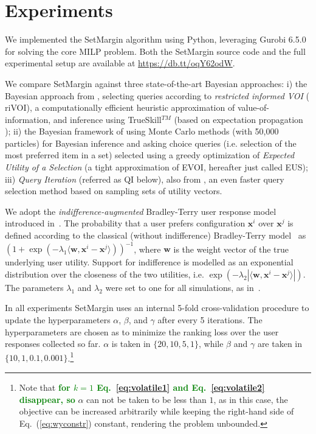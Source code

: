\documentclass{article}
\renewcommand\[{\begin{equation}}
\renewcommand\]{\end{equation}}
\newcommand{\vecvar}[1]{\ensuremath{\boldsymbol{#1}}}
\newcommand{\vw}{\vecvar{w}}
\newcommand{\vx}{\vecvar{x}}
\newcommand{\stefano}[1]{{\bf \textcolor{green}{{\fbox{Stefano:} #1}}}}
\begin{document}
\section{Experiments}
\label{sec:experiments}

We implemented the {\sc SetMargin} algorithm using Python, leveraging Gurobi
6.5.0 for solving the core MILP problem. Both the {\sc SetMargin} source code
and the full experimental setup are available at \url{https://db.tt/oqY62odW}.

We compare {\sc SetMargin} against three state-of-the-art Bayesian
approaches: i) the Bayesian approach from \cite{guo2010real},
selecting queries according to {\em restricted informed VOI} ({\sc
  riVOI}), a computationally efficient heuristic approximation of
value-of-information, and inference using TrueSkill$^{TM}$
\cite{HerbrichMG06} (based on expectation
propagation \cite{Minka01}); ii) the Bayesian framework of
\cite{viappiani2010optimal} using Monte Carlo methods (with 50,000
particles) for Bayesian inference and asking choice queries
(i.e. selection of the most preferred item in a set) selected
using a greedy optimization of {\em Expected Utility of a Selection} (a tight
approximation of EVOI, hereafter just called {\sc
  EUS}); iii) {\em Query Iteration} (referred as {\sc QI} below), also
from \cite{viappiani2010optimal}, an even faster query selection
method based on sampling sets of utility vectors. %

We adopt the {\em indifference-augmented} Bradley-Terry user response
model introduced in~\cite{guo2010real}. The probability that a user
prefers configuration $\vx^i$ over $\vx^j$ is defined according to the
classical (without indifference) Bradley-Terry model~\cite{BraTer52} as
$ (1 + \exp(-\lambda_1 \langle\vw,\vx^i - \vx^j\rangle))^{-1} $,
where $\vw$ is the weight vector of the true underlying user utility.
Support for indifference is modelled as an exponential distribution
over the closeness of the two utilities, i.e. 
$ \exp(-\lambda_2 |\langle\vw,\vx^i - \vx^j\rangle|).$
The parameters $\lambda_1$ and $\lambda_2$ were set to one for all
simulations, as in~\cite{guo2010real}.

In all experiments {\sc SetMargin} uses an internal 5-fold cross-validation procedure to
update the hyperparameters $\alpha$, $\beta$, and $\gamma$ after every 5
iterations. The hyperparameters are chosen as to minimize the ranking loss over
the user responses collected so far. $\alpha$ is taken in $\{20, 10, 5, 1\}$,
while $\beta$ and $\gamma$ are taken in $\{10, 1, 0.1, 0.001\}$.\footnote{Note
that \stefano{for $k=1$ Eq.~\ref{eq:volatile1} and Eq.~\ref{eq:volatile2} disappear,
so} $\alpha$ can not be taken to be less than $1$, as in this case, the
objective can be increased arbitrarily while keeping the right-hand side of
Eq.~(\ref{eq:wyconstr}) constant, rendering the problem unbounded.}
\end{document}
